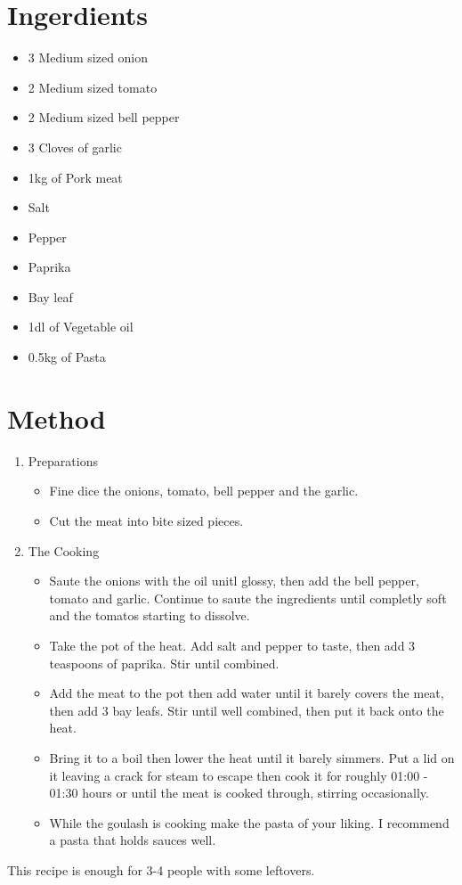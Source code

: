 \documentclass[
	11pt, %
	fleqn, %
	a4paper, %
]{LegrandOrangeBook}
\begin{document}
		\section{Ingerdients}
			\begin{itemize}
				\item 3 Medium sized onion
				\item 2 Medium sized tomato
				\item 2 Medium sized bell pepper
				\item 3 Cloves of garlic
				\item 1kg of Pork meat
				\item Salt
				\item Pepper
				\item Paprika
				\item Bay leaf
				\item 1dl of Vegetable oil
				\item 0.5kg of Pasta
			\end{itemize}
		\section{Method}
			\begin{enumerate}
				\item Preparations
					\begin{itemize}
						\item Fine dice the onions, tomato, bell pepper and the garlic.
						\item Cut the meat into bite sized pieces.
					\end{itemize}
				\item The Cooking
					\begin{itemize}
						\item Saute the onions with the oil unitl glossy, then add the bell pepper, tomato and garlic. Continue to saute the ingredients until completly soft and the tomatos starting to dissolve.
						\item Take the pot of the heat. Add salt and pepper to taste, then add 3 teaspoons of paprika. Stir until combined.
						\item Add the meat to the pot then add water until it barely covers the meat, then add 3 bay leafs. Stir until well combined, then put it back onto the heat.
						\item Bring it to a boil then lower the heat until it barely simmers. Put a lid on it leaving a crack for steam to escape then cook it for roughly 01:00 - 01:30 hours or until the meat is cooked through, stirring occasionally.
						\item While the goulash is cooking make the pasta of your liking. I recommend a pasta that holds sauces well.
					\end{itemize}
			\end{enumerate}
			This recipe is enough for 3-4 people with some leftovers.
\end{document}
